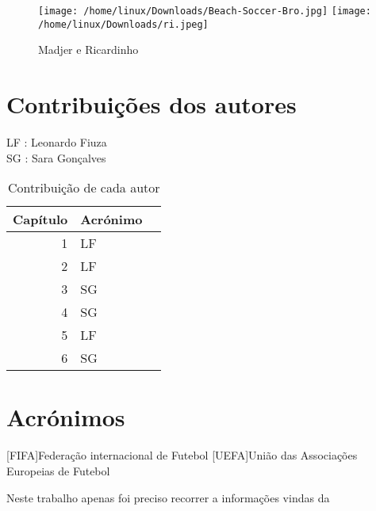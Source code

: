 \documentclass[a4paper,12pt]{report}
\begin{document}
\begin{figure}[!htp]
\texttt{[image: /home/linux/Downloads/Beach-Soccer-Bro.jpg]}
\texttt{[image: /home/linux/Downloads/ri.jpeg]}
\caption{Madjer e Ricardinho}
\end{figure}

\chapter*{Contribuições dos autores}
LF : Leonardo Fiuza \\
SG : Sara Gonçalves
\begin{table}[h]
\centering
\caption{Contribuição de cada autor}
\vspace{0.5cm}
\begin{tabular}{r|lr}
Capítulo & Acrónimo \\
\hline
1 &  LF \\
2 &  LF \\
3 &  SG \\
4 &  SG \\
5 &  LF \\
6 &  SG \\
\end{tabular}
\end{table}
\chapter*{Acrónimos}
\begin{acronym}
[FIFA]{Federação internacional de Futebol}
[UEFA]{União das Associações Europeias de Futebol} 
\end{acronym}

\printbibliography
Neste trabalho apenas foi preciso recorrer a informações vindas da \cite{wiki:Futebol}
\end{document}
